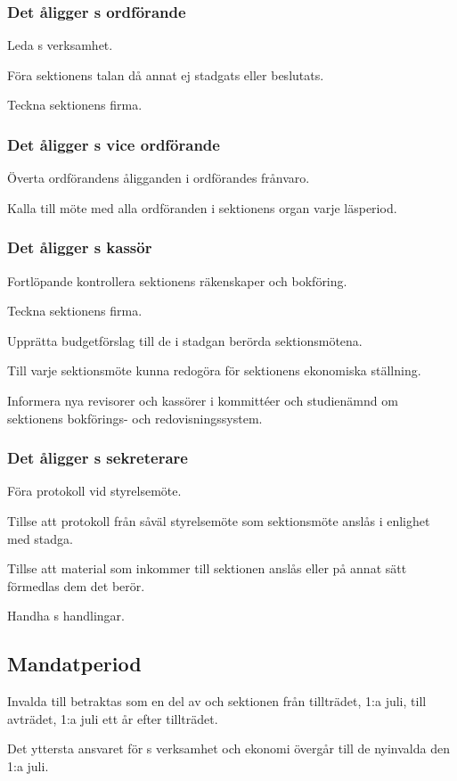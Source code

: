 \subsubsection{Det åligger \STYRIT{}s ordförande}
\begin{att}
	\item Leda \STYRIT{}s verksamhet.
	\item Föra sektionens talan då annat ej stadgats eller beslutats.
	\item Teckna sektionens firma.
\end{att}

\subsubsection{Det åligger \STYRIT{}s vice ordförande}
\begin{att}
	\item Överta ordförandens åligganden i ordförandes frånvaro.
	\item Kalla till möte med alla ordföranden i sektionens organ varje läsperiod.
\end{att}

\subsubsection{Det åligger \STYRIT{}s kassör}
\begin{att}
	\item Fortlöpande kontrollera sektionens räkenskaper och bokföring.
	\item Teckna sektionens firma.
	\item Upprätta budgetförslag till de i stadgan berörda sektionsmötena.
	\item Till varje sektionsmöte kunna redogöra för sektionens ekonomiska ställning.
	\item Informera nya revisorer och kassörer i kommittéer och studienämnd om sektionens bokförings- och redovisningssystem.
\end{att}
 
\subsubsection{Det åligger \STYRIT{}s sekreterare}
\begin{att}
	\item Föra protokoll vid styrelsemöte.
	\item Tillse att protokoll från såväl styrelsemöte som sektionsmöte anslås i enlighet med stadga.
	\item Tillse att material som inkommer till sektionen anslås eller på annat sätt förmedlas dem det berör.
	\item Handha \STYRIT{}s handlingar.
\end{att}

\subsection{Mandatperiod}
Invalda till \STYRIT{} betraktas som en del av \STYRIT{} och sektionen från tillträdet, 1:a juli, till avträdet, 1:a juli ett år efter tillträdet.

Det yttersta ansvaret för \STYRIT{}s verksamhet och ekonomi övergår till de nyinvalda den 1:a juli.
